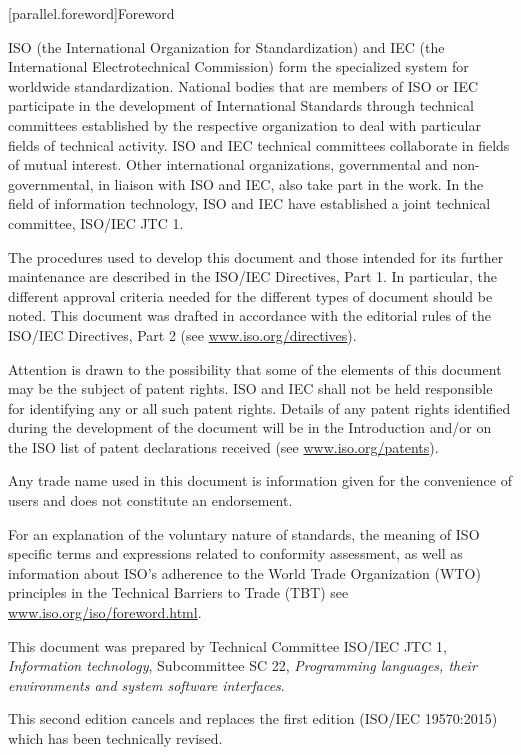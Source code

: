 
[parallel.foreword]{Foreword}

\pnum
ISO (the International Organization for Standardization) and IEC (the
    International Electrotechnical Commission) form the specialized system for
worldwide standardization. National bodies that are members of ISO or IEC
participate in the development of International Standards through technical
committees established by the respective organization to deal with particular
fields of technical activity. ISO and IEC technical committees collaborate in
fields of mutual interest. Other international organizations, governmental and
non-governmental, in liaison with ISO and IEC, also take part in the work. In
the field of information technology, ISO and IEC have established a joint
technical committee, ISO/IEC JTC 1.

\pnum
The procedures used to develop this document and those intended for its
further maintenance are described in the ISO/IEC Directives, Part 1. In
particular, the different approval criteria needed for the different types of
document should be noted. This document was drafted in accordance with the
editorial rules of the ISO/IEC Directives, Part 2 (see \url{www.iso.org/directives}).

\pnum
Attention is drawn to the possibility that some of the elements of this
document may be the subject of patent rights. ISO and IEC shall not be held
responsible for identifying any or all such patent rights. Details of any
patent rights identified during the development of the document will be in the
Introduction and/or on the ISO list of patent declarations received (see
    \url{www.iso.org/patents}).

\pnum
Any trade name used in this document is information given for the convenience
of users and does not constitute an endorsement.

\pnum
For an explanation of the voluntary nature of standards, the meaning of ISO
specific terms and expressions related to conformity assessment, as well as
information about ISO's adherence to the World Trade Organization (WTO)
principles in the Technical Barriers to Trade (TBT) see
\url{www.iso.org/iso/foreword.html}.

\pnum
This document was prepared by Technical Committee ISO/IEC JTC 1, \textit{Information
technology}, Subcommittee SC 22, \textit{Programming languages, their environments and
system software interfaces}.

\pnum
This second edition cancels and replaces the first edition (ISO/IEC 19570:2015)
which has been technically revised.


